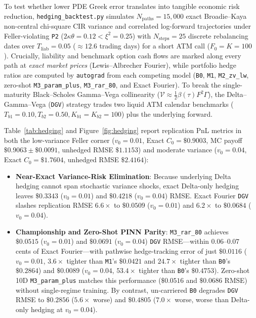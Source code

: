\documentclass[11pt,a4paper]{article}
\begin{document}
To test whether lower PDE Greek error translates into tangible economic risk reduction, \texttt{hedging\_backtest.py} simulates $N_{\mathrm{paths}} = 15{,}000$ exact Broadie--Kaya \cite{broadie2006exact} non-central chi-square CIR variance and correlated log-forward trajectories under Feller-violating \texttt{P2} ($2\kappa\theta = 0.12 < \xi^2 = 0.25$) with $N_{\mathrm{steps}} = 25$ discrete rebalancing dates over $T_{\mathrm{liab}} = 0.05$ ($\approx 12.6$ trading days) for a short ATM call ($F_0 = K = 100$). Crucially, liability and benchmark option cash flows are marked along every path at \emph{exact market prices} (Lewis--Albrecher Fourier), while portfolio hedge ratios are computed by \texttt{autograd} from each competing model (\texttt{B0}, \texttt{M1}, \texttt{M2\_zv\_lw}, zero-shot \texttt{M3\_param\_plus}, \texttt{M3\_rar\_80}, and Exact Fourier). To break the single-maturity Black--Scholes Gamma--Vega collinearity ($\mathcal{V} \approx \frac{1}{2}\beta(\tau)F^2\Gamma$), the Delta--Gamma--Vega (\texttt{DGV}) strategy trades two liquid ATM calendar benchmarks ($T_{b1} = 0.10, T_{b2} = 0.50, K_{b1} = K_{b2} = 100$) plus the underlying forward.

Table~\ref{tab:hedging} and Figure~\ref{fig:hedging} report replication PnL metrics in both the low-variance Feller corner ($v_0 = 0.01$, Exact $C_0 = \$0.9003$, MC payoff $\$0.9063 \pm \$0.0091$, unhedged RMSE $\$1.1153$) and moderate variance ($v_0 = 0.04$, Exact $C_0 = \$1.7604$, unhedged RMSE $\$2.4164$):
\begin{itemize}
  \item \textbf{Near-Exact Variance-Risk Elimination}: Because underlying Delta hedging cannot span stochastic variance shocks, exact Delta-only hedging leaves $\$0.3343$ ($v_0 = 0.01$) and $\$0.4218$ ($v_0 = 0.04$) RMSE. Exact Fourier \texttt{DGV} slashes replication RMSE $\mathbf{6.6\times}$ to $\mathbf{\$0.0509}$ ($v_0 = 0.01$) and $\mathbf{6.2\times}$ to $\mathbf{\$0.0684}$ ($v_0 = 0.04$).
  \item \textbf{Championship and Zero-Shot PINN Parity}: \texttt{M3\_rar\_80} achieves $\mathbf{\$0.0515}$ ($v_0 = 0.01$) and $\mathbf{\$0.0691}$ ($v_0 = 0.04$) \texttt{DGV} RMSE---within $\mathbf{0.06\text{--}0.07}$ cents of Exact Fourier---with pathwise hedge-tracking error of just $\$0.0116$ ($v_0 = 0.01$, $\mathbf{3.6\times}$ tighter than \texttt{M1}'s $\$0.0421$ and $\mathbf{24.7\times}$ tighter than \texttt{B0}'s $\$0.2864$) and $\$0.0089$ ($v_0 = 0.04$, $\mathbf{53.4\times}$ tighter than \texttt{B0}'s $\$0.4753$). Zero-shot 10D \texttt{M3\_param\_plus} matches this performance ($\mathbf{\$0.0516}$ and $\mathbf{\$0.0686}$ RMSE) without single-regime training. By contrast, un-carriered \texttt{B0} degrades \texttt{DGV} RMSE to $\$0.2856$ ($5.6\times$ worse) and $\$0.4805$ ($7.0\times$ worse, worse than Delta-only hedging at $v_0 = 0.04$).
\end{itemize}
\end{document}
